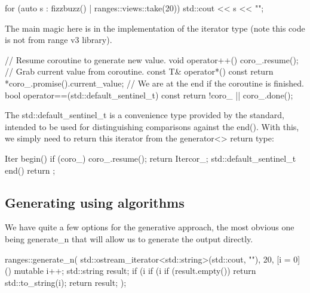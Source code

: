 \begin{box-note}
\begin{cppcode}
for (auto s : fizzbuzz() | ranges::views::take(20)) {
    std::cout << s << "\n";
}
\end{cppcode}
\end{box-note}

The main magic here is in the implementation of the iterator type (note this code is not from range v3 library).

\begin{box-note}
\begin{cppcode}
// Resume coroutine to generate new value.
void operator++() { 
    coro_.resume(); 
}
// Grab current value from coroutine.
const T& operator*() const {
    return *coro_.promise().current_value;
}
// We are at the end if the coroutine is finished.
bool operator==(std::default_sentinel_t) const { 
    return !coro_ || coro_.done(); 
}
\end{cppcode}
\end{box-note}

The std::default\_sentinel\_t is a convenience type provided by the standard, intended to be used for distinguishing comparisons against the end(). With this, we simply need to return this iterator from the generator<> return type:

\begin{box-note}
\begin{cppcode}
Iter begin() {
    if (coro_) {
        coro_.resume();
    } 
    return Iter{cor_};
}
std::default_sentinel_t end() { 
    return {}; 
}
\end{cppcode}
\end{box-note}

\subsection{Generating using algorithms}

We have quite a few options for the generative approach, the most obvious one being generate\_n that will allow us to generate the output directly.

\begin{box-note}
\begin{cppcode}
ranges::generate_n(
    std::ostream_iterator<std::string>(std::cout, "\n"), 
    20,
    [i = 0]() mutable {
        i++;
        std::string result;
        if (i %
        if (i %
        if (result.empty()) return std::to_string(i);
        return result;
});
\end{cppcode}
\end{box-note}

